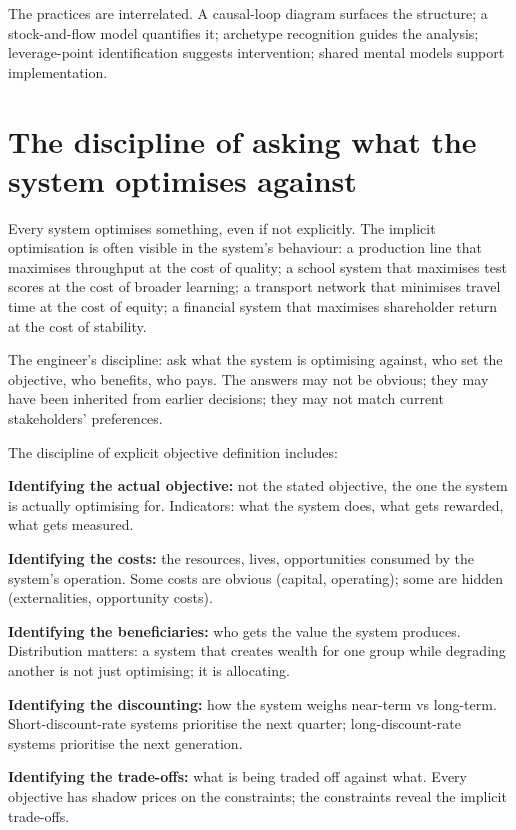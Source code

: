 The practices are interrelated. A causal-loop diagram surfaces the structure; a stock-and-flow model quantifies it; archetype recognition guides the analysis; leverage-point identification suggests intervention; shared mental models support implementation.

\section{The discipline of asking what the system optimises against}

Every system optimises something, even if not explicitly. The implicit optimisation is often visible in the system's behaviour: a production line that maximises throughput at the cost of quality; a school system that maximises test scores at the cost of broader learning; a transport network that minimises travel time at the cost of equity; a financial system that maximises shareholder return at the cost of stability.

The engineer's discipline: ask what the system is optimising against, who set the objective, who benefits, who pays. The answers may not be obvious; they may have been inherited from earlier decisions; they may not match current stakeholders' preferences.

The discipline of explicit objective definition includes:

\textbf{Identifying the actual objective:} not the stated objective, the one the system is actually optimising for. Indicators: what the system does, what gets rewarded, what gets measured.

\textbf{Identifying the costs:} the resources, lives, opportunities consumed by the system's operation. Some costs are obvious (capital, operating); some are hidden (externalities, opportunity costs).

\textbf{Identifying the beneficiaries:} who gets the value the system produces. Distribution matters: a system that creates wealth for one group while degrading another is not just optimising; it is allocating.

\textbf{Identifying the discounting:} how the system weighs near-term vs long-term. Short-discount-rate systems prioritise the next quarter; long-discount-rate systems prioritise the next generation.

\textbf{Identifying the trade-offs:} what is being traded off against what. Every objective has shadow prices on the constraints; the constraints reveal the implicit trade-offs.

